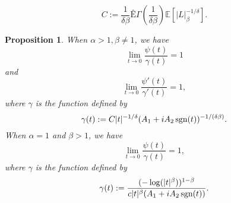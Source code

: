 \documentclass[oneside, a4paper,11pt,reqno]{amsart}
\newtheorem{prop}[hypo]{Proposition}
\begin{document}
$$C:= \frac{1}{\delta\beta}Ê\Gamma( \frac{1}{\delta\beta}) {\mathbb E}[ |L|_\beta^{-1/\delta}].  $$
\begin{prop}\label{series-2}
When $\alpha>1, \beta\ne 1$, we have
\begin{equation}
\label{lim-psi} 
\lim_{t\rightarrow 0} \frac{\psi(t)}{\gamma(t)}=1
\end{equation} and
\begin{equation}
\label{lim-psi-deri}
\lim_{t\rightarrow 0} \frac{\psi'(t)}{\gamma'(t)}=1,
\end{equation}
where $\gamma$ is the function defined by
$$ \gamma(t):=C |t|^{-1/\delta}  (A_1+ iA_2\, \mbox{\rm sgn}(t))^{-1/(\delta\beta)}.$$
When $\alpha=1$ and $\beta>1$, we have
\begin{equation}
\label{lim-psi2} 
\lim_{t\rightarrow 0} \frac{\psi(t)}{\gamma(t)}=1,
\end{equation}
where $\gamma$ is the function defined by $$\gamma(t):=\frac{(-\log (|t|^\beta) )
   ^{1-\beta}}{c |t|^{\beta} (A_1+ iA_2\, \mbox{\rm sgn}(t)) }. $$
\end{prop}
\end{document}
